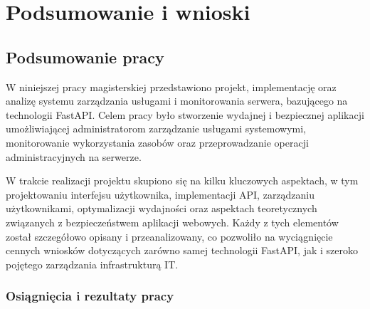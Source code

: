 \chapter{Podsumowanie i wnioski}

\section{Podsumowanie pracy}

W niniejszej pracy magisterskiej przedstawiono projekt, implementację oraz analizę systemu zarządzania usługami i monitorowania serwera, bazującego na technologii FastAPI. Celem pracy było stworzenie wydajnej i bezpiecznej aplikacji umożliwiającej administratorom zarządzanie usługami systemowymi, monitorowanie wykorzystania zasobów oraz przeprowadzanie operacji administracyjnych na serwerze.

W trakcie realizacji projektu skupiono się na kilku kluczowych aspektach, w tym projektowaniu interfejsu użytkownika, implementacji API, zarządzaniu użytkownikami, optymalizacji wydajności oraz aspektach teoretycznych związanych z bezpieczeństwem aplikacji webowych. Każdy z tych elementów został szczegółowo opisany i przeanalizowany, co pozwoliło na wyciągnięcie cennych wniosków dotyczących zarówno samej technologii FastAPI, jak i szeroko pojętego zarządzania infrastrukturą IT.

\subsection{Osiągnięcia i rezultaty pracy}

